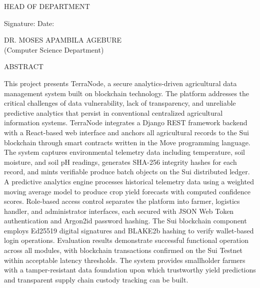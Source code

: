 \documentclass[12pt,a4paper]{report}
\begin{document}
\vspace{1.2cm}

\noindent
HEAD OF DEPARTMENT

\vspace{0.6cm}

\noindent
Signature: \makebox[2in]{\dotfill} \hspace{1cm} Date: \makebox[2in]{\dotfill}

\vspace{0.3cm}

\noindent
DR. MOSES APAMBILA AGEBURE\\
(Computer Science Department)

\newpage
\begin{center}
    {\normalsize ABSTRACT}
\end{center}
\vspace{1cm}
\onehalfspacing

This project presents TerraNode, a secure analytics-driven agricultural data management system built on blockchain technology. The platform addresses the critical challenges of data vulnerability, lack of transparency, and unreliable predictive analytics that persist in conventional centralized agricultural information systems. TerraNode integrates a Django REST framework backend with a React-based web interface and anchors all agricultural records to the Sui blockchain through smart contracts written in the Move programming language. The system captures environmental telemetry data including temperature, soil moisture, and soil pH readings, generates SHA-256 integrity hashes for each record, and mints verifiable produce batch objects on the Sui distributed ledger. A predictive analytics engine processes historical telemetry data using a weighted moving average model to produce crop yield forecasts with computed confidence scores. Role-based access control separates the platform into farmer, logistics handler, and administrator interfaces, each secured with JSON Web Token authentication and Argon2id password hashing. The Sui blockchain component employs Ed25519 digital signatures and BLAKE2b hashing to verify wallet-based login operations. Evaluation results demonstrate successful functional operation across all modules, with blockchain transactions confirmed on the Sui Testnet within acceptable latency thresholds. The system provides smallholder farmers with a tamper-resistant data foundation upon which trustworthy yield predictions and transparent supply chain custody tracking can be built.
\end{document}
